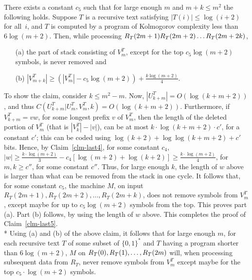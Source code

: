 \documentclass{LMCS}
\theoremstyle{plain}\newtheorem{athm}[thm]{Theorem}
\theoremstyle{plain}\newtheorem{aprop}[thm]{Proposition}
\theoremstyle{plain}\newtheorem{aprob}[thm]{Open Problem}
\theoremstyle{plain}\newtheorem{acor}[thm]{Corollary}
\theoremstyle{plain}\newtheorem{alem}[thm]{Lemma}
\theoremstyle{definition}\newtheorem{adefn}[thm]{Definition}
\theoremstyle{definition}\newtheorem{arem}[thm]{Remark}
\theoremstyle{plain}\newtheorem{aexmp}[thm]{Example}
\theoremstyle{plain}\newtheorem{aclm}[thm]{Claim}
\def\sp{\\*\indent}
\begin{document}
\begin{clm}\label{clm-last5}
There exists a constant $c_5$ such that
for large enough $m$ and $m+k \leq m^2$ the following holds. 
Suppose $T$ is a recursive text 
satisfying $|T(i)| \leq \log(i+2)$ for all~$i$, and $T$
is computed by a program of Kolmogorov complexity less than $6 \log(m+2)$.
Then, while processing $R_T(2m+1)\linebreak[3] R_T(2m+2)\ldots R_T(2m+2k)$,
\begin{enumerate}[(a)]
\item[(a)] the part of stack consisting of $V^T_m$, except for the top 
$c_5\log(m+2)$ symbols, is never removed and
\item[(b)] $|V^T_{m+k}| \geq (|V^T_m| - c_5\log(m+2))+\frac{k\log(m+2)}{4}$.
\end{enumerate}
\end{clm}

\noindent
To show the claim, consider $k \leq m^2-m$.
Now, $|U^T_{k+m}| = O(\log(k+m+2))$, and 
thus $C(U^T_{k+m}|U^T_m,V^T_m,k) =O(\log(k+m+2))$.
Furthermore, if $V^T_{k+m}=vw$, for some longest prefix $v$ of $V^T_m$, then
the length of the deleted portion of $V^T_m$ (that is $|V^T_k|-|v|$),
can be at most $k \cdot \log(k+m+2) \cdot c'$, for a constant $c'$;
this can be coded using $\log(k+2) + \log\log(k+m+2) + c'$ bits.
Hence, by Claim~\ref{clm-last4}, for some constant $c_4$, $|w| \geq
\frac{k \cdot \log(m+2)}{3} - c_4[\log(m+2) + \log(k+2)]
\geq \frac{k \cdot \log(m+2)}{4}$, for $m, k\geq c''$, for some constant $c''$.
Thus, for large enough $k$, the length of $w$ above 
is larger than what can be removed from the stack in one cycle.
It follows that, for some constant $c_5$, 
the machine $M$, on input $R_T(2m+1),R_T(2m+2),\ldots,R_T(2m+k)$,
does not remove symbols from $V_m^T$,
except maybe for up to $c_5 \log(m+2)$ symbols from the top.
This proves part (a). Part (b) follows, by using the length of $w$
above. This completes the proof of Claim~\ref{clm-last5}.
\sp
Using (a) and (b) of the above claim, it follows that
for large enough $m$,
for each recursive text $T$ of some subset of $\{0,1\}^*$ and
$T$ having a program shorter than $6\log(m+2)$, 
$M$ on $R_T(0), \linebreak[3]
R_T(1),\ldots,R_T(2m)$ will, when processing subsequent data
from $R_T$, never remove symbols from $V_m^T$ except maybe for the
top $c_5 \cdot \log(m+2)$ symbols.
\end{document}
